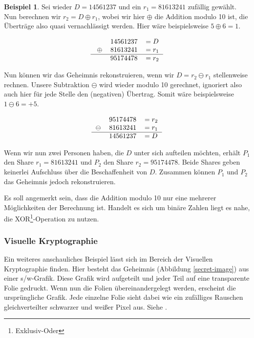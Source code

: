 \documentclass[12pt, a4paper, oneside, titlepage]{report}
\theoremstyle{definition}
\newtheorem{bsp}[lemma]{Beispiel}
\begin{document}
	\begin{bsp}
		Sei wieder $ D = 14561237 $ und ein $ r_1 = 81613241 $ zufällig gewählt. Nun berechnen wir $ r_2 = D \oplus r_1 $, wobei wir hier $ \oplus $ die Addition modulo 10 ist, die Überträge also quasi vernachlässigt werden. Hier wäre beispielsweise $ 5 \oplus 6 = 1 $.
	
	\begin{equation}
		\begin{tabular}{crl}
		  &14561237&$ = D $\\\
		$\oplus$&81613241&$ = r_1 $\\\hline
		  &95174478&$ = r_2 $
		\end{tabular}
	\end{equation}

	Nun können wir das Geheimnis rekonstruieren, wenn wir $ D = r_2 \ominus r_1 $ stellenweise rechnen. Unsere Subtraktion $ \ominus $ wird wieder modulo 10 gerechnet, ignoriert also auch hier für jede Stelle den (negativen) Übertrag. Somit wäre beispielsweise $ 1 \ominus 6 = + 5 $.
	
	\begin{equation}
	\begin{tabular}{crl}
	&95174478&$ = r_2 $\\
	$\ominus$&81613241&$ = r_1 $\\\hline
	&14561237&$ = D $
	\end{tabular}
	\end{equation}
	
	Wenn wir nun zwei Personen haben, die $ D $ unter sich aufteilen möchten, erhält $ P_1 $ den Share $ r_1 = 81613241 $ und $ P_2 $ den Share $ r_2 = 95174478$. Beide Shares geben keinerlei Aufschluss über die Beschaffenheit von $ D $. Zusammen können $ P_1 $ und $ P_2 $ das Geheimnis jedoch rekonstruieren.
	\end{bsp}

	Es soll angemerkt sein, dass die Addition modulo 10 nur eine mehrerer Möglichkeiten der Berechnung ist. Handelt es sich um binäre Zahlen liegt es nahe, die XOR\footnote{Exklusiv-Oder}-Operation zu nutzen.
	
	\subsubsection{Visuelle Kryptographie}

	Ein weiteres anschauliches Beispiel lässt sich im Bereich der Visuellen Kryptographie finden. Hier besteht das Geheimnis (Abbildung \ref{secret-image}) aus einer s/w-Grafik. Diese Grafik wird aufgeteilt und jeder Teil auf eine transparente Folie gedruckt. Wenn nun die Folien übereinandergelegt werden, erscheint die ursprüngliche Grafik. Jede einzelne Folie sieht dabei wie ein zufälliges Rauschen gleichverteilter schwarzer und weißer Pixel aus. Siehe \cite{shamir_naor}.
	
\end{document}
